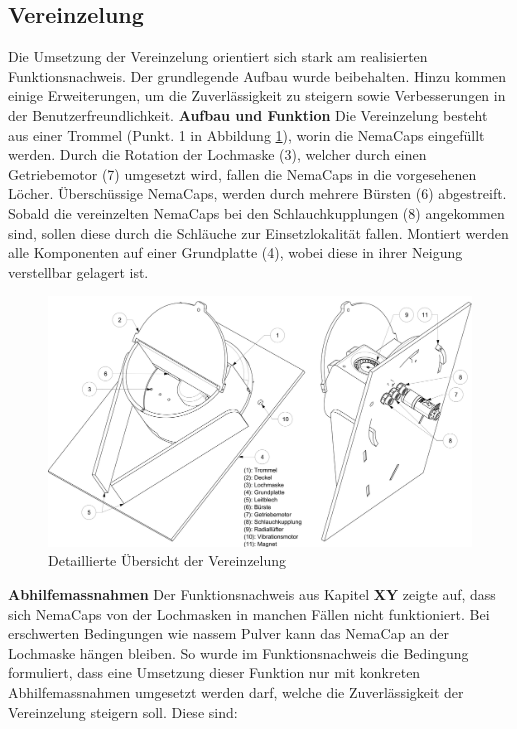 \subsection{Vereinzelung}
Die Umsetzung der Vereinzelung orientiert sich stark am realisierten Funktionsnachweis. Der grundlegende Aufbau wurde beibehalten. Hinzu kommen einige Erweiterungen, um die Zuverlässigkeit zu steigern sowie Verbesserungen in der Benutzerfreundlichkeit.
\newline
\newline
\textbf{Aufbau und Funktion}
\newline
Die Vereinzelung besteht aus einer Trommel (Punkt. 1 in Abbildung \ref{fig:details_vereinzelung}), worin die NemaCaps eingefüllt werden. Durch die Rotation der Lochmaske (3), welcher durch einen Getriebemotor (7) umgesetzt wird, fallen die NemaCaps in die vorgesehenen Löcher. Überschüssige NemaCaps, werden durch mehrere Bürsten (6) abgestreift. Sobald die vereinzelten NemaCaps bei den Schlauchkupplungen (8) angekommen sind, sollen diese durch die Schläuche zur Einsetzlokalität fallen. Montiert werden alle Komponenten auf einer Grundplatte (4), wobei diese in ihrer Neigung verstellbar gelagert ist.
	\begin{figure}[H]
	\includegraphics[scale=0.45]{Illustrationen/6-Umsetzung/details_vereinzelung.jpg}
	\caption{Detaillierte Übersicht der Vereinzelung}
	\label{fig:details_vereinzelung}
	\end{figure}
\textbf{Abhilfemassnahmen}
\newline
Der Funktionsnachweis aus Kapitel \textbf{XY} zeigte auf, dass sich NemaCaps von der Lochmasken in manchen Fällen nicht funktioniert. Bei erschwerten Bedingungen wie nassem Pulver kann das NemaCap an der Lochmaske hängen bleiben. So wurde im Funktionsnachweis die Bedingung formuliert, dass eine Umsetzung dieser Funktion nur mit konkreten Abhilfemassnahmen umgesetzt werden darf, welche die Zuverlässigkeit der Vereinzelung steigern soll. Diese sind:

